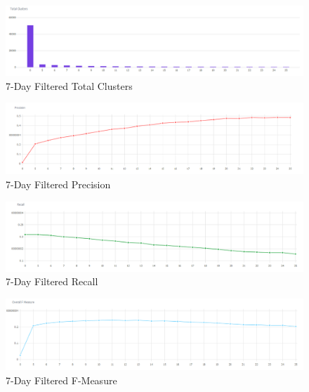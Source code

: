 \documentclass[a4paper,portrait,12pt]{article}
\begin{document}
\begin{figure}[H]
	\centering
	\includegraphics[width=\linewidth]{images/7days-filtered-total-clusters.png}
	\caption{7-Day Filtered Total Clusters}
	\label{fig:7days-filtered-total-clusters}
\end{figure}

\begin{figure}[H]
	\centering
	\includegraphics[width=\linewidth]{images/7days-filtered-precision.png}
	\caption{7-Day Filtered Precision}
	\label{fig:7days-filtered-precision}
\end{figure}

\begin{figure}[H]
	\centering
	\includegraphics[width=\linewidth]{images/7days-filtered-recall.png}
	\caption{7-Day Filtered Recall}
	\label{fig:7days-filtered-recall}
\end{figure}

\begin{figure}[H]
	\centering
	\includegraphics[width=\linewidth]{images/7days-filtered-f-measure.png}
	\caption{7-Day Filtered F-Measure}
	\label{fig:7days-filtered-f-measure}
\end{figure}
\end{document}
